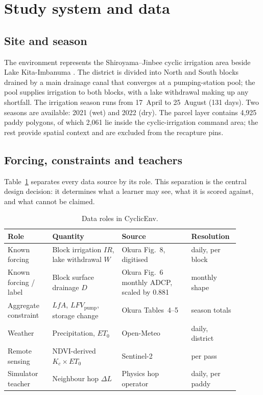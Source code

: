 \documentclass[preprint,12pt,authoryear,review]{elsarticle}
\begin{document}
\section{Study system and data}
\label{sec:data}

\subsection{Site and season}

The environment represents the Shiroyama--Jinbee cyclic irrigation area beside Lake Kita-Imbanuma \citep{okura2025}. The district is divided into North and South blocks drained by a main drainage canal that converges at a pumping-station pool; the pool supplies irrigation to both blocks, with a lake withdrawal making up any shortfall. The irrigation season runs from 17~April to 25~August (131 days). Two seasons are available: 2021 (wet) and 2022 (dry). The parcel layer contains 4,925 paddy polygons, of which 2,061 lie inside the cyclic-irrigation command area; the rest provide spatial context and are excluded from the recapture pins.

\subsection{Forcing, constraints and teachers}

Table~\ref{tab:roles} separates every data source by its role. This separation is the central design decision: it determines what a learner may see, what it is scored against, and what cannot be claimed.

\begin{table}[htbp]
\centering
\footnotesize
\caption{Data roles in CyclicEnv.}
\label{tab:roles}
\begin{tabular}{p{0.18\linewidth}p{0.28\linewidth}p{0.28\linewidth}p{0.16\linewidth}}
\toprule
Role & Quantity & Source & Resolution \\
\midrule
Known forcing & Block irrigation $IR$, lake withdrawal $W$ & Okura Fig.~8, digitised & daily, per block \\
Known forcing / label & Block surface drainage $D$ & Okura Fig.~6 monthly ADCP, scaled by 0.881 & monthly shape \\
Aggregate constraint & $LfA$, $LFV_{\mathrm{pump}}$, storage change & Okura Tables~4--5 & season totals \\
Weather & Precipitation, $ET_0$ & Open-Meteo \citep{zippenfenig2023} & daily, district \\
Remote sensing & NDVI-derived $K_c \times ET_0$ & Sentinel-2 \citep{drusch2012} & per pass \\
Simulator teacher & Neighbour hop $\Delta L$ & Physics hop operator & daily, per paddy \\
\bottomrule
\end{tabular}
\end{table}
\end{document}
